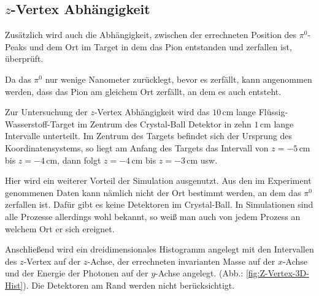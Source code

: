\documentclass[a4paper,11pt,oneside,final,german,openbib,pdftex]{scrbook}
\begin{document}
{%

\subsection{$z$-Vertex Abh\"angigkeit}
\label{sec:Z-Vertex-Abhaengigkeit}


Zusätzlich wird auch die Abh\"angigkeit, zwischen der errechneten  Position des $\pi^0$-Peaks und dem Ort im Target in dem das Pion entstanden und zerfallen ist, \"uberpr\"uft. 

Da das $\pi^0$ nur wenige Nanometer zur\"ucklegt, bevor es zerf\"allt, kann angenommen werden, dass das Pion am gleichem Ort zerf\"allt, an dem es auch entsteht.


Zur Untersuchung der $z$-Vertex Abhängigkeit wird das $ 10\,\text{cm}$ lange Fl\"ussig-Wasserstoff-Target im Zentrum des Crystal-Ball Detektor in zehn $1\,\text{cm}$ lange Intervalle unterteilt. 
Im Zentrum des Targets befindet sich der Ursprung des Koordinatensystems, so liegt am Anfang des Targets das Intervall von $z=-5\,\text{cm}$ bis $z=-4\,\text{cm}$, dann folgt $z=-4\,\text{cm}$ bis $z=-3\,\text{cm}$ usw. 

Hier wird ein weiterer Vorteil der Simulation ausgenutzt. Aus den im Experiment genommenen Daten kann n\"amlich nicht der Ort bestimmt werden, an dem das $\pi^0$ zerfallen ist. Daf\"ur gibt es keine Detektoren im Crystal-Ball. In Simulationen sind alle Prozesse allerdings wohl bekannt, so wei{\ss} man auch von jedem Prozess an welchem Ort er sich ereignet. 

Anschließend wird ein dreidimensionales Histogramm angelegt mit den Intervallen des $z$-Vertex auf der $z$-Achse, der errechneten invarianten Masse auf der $x$-Achse und der Energie der Photonen auf der $y$-Achse angelegt. (Abb.: \ref{fig:Z-Vertex-3D-Hist}). Die Detektoren am Rand werden nicht ber\"ucksichtigt.

}
\end{document}
